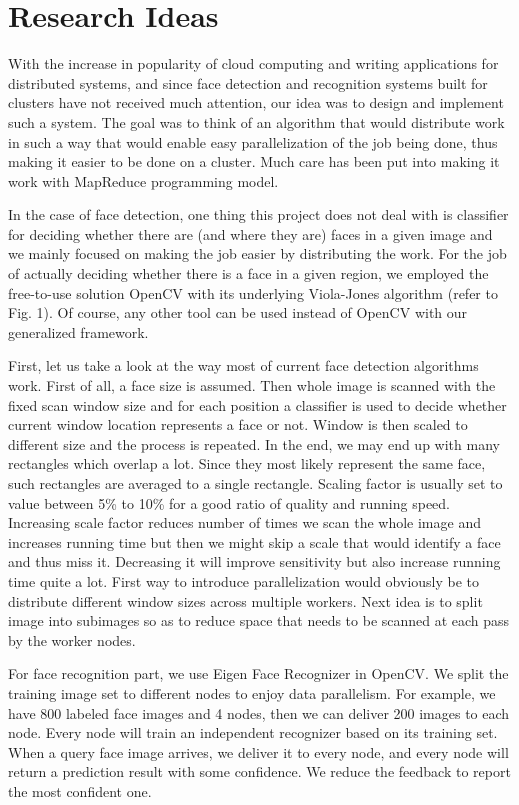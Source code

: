 \documentclass[11pt, draftclsnofoot, onecolumn]{IEEEtran}
\begin{document}
\section{Research Ideas}  \label{sec:ideas}

With the increase in popularity of cloud computing and writing applications for distributed systems, and since face detection and recognition systems built for clusters have not received much attention, our idea was to design and implement such a system. The goal was to think of an algorithm that would distribute work in such a way that would enable easy parallelization of the job being done, thus making it easier to be done on a cluster. Much care has been put into making it work with MapReduce programming model.

In the case of face detection, one thing this project does not deal with is classifier for deciding whether there are (and where they are) faces in a given image and we mainly focused on making the job easier by distributing the work. For the job of actually deciding whether there is a face in a given region, we employed the free-to-use solution OpenCV with its underlying Viola-Jones algorithm (refer to Fig. 1). Of course, any other tool can be used instead of OpenCV with our generalized framework.

First, let us take a look at the way most of current face detection algorithms work. First of all, a face size is assumed. Then whole image is scanned with the fixed scan window size and for each position a classifier is used to decide whether current window location represents a face or not. Window is then scaled to different size and the process is repeated. In the end, we may end up with many rectangles which overlap a lot. Since they most likely represent the same face, such rectangles are averaged to a single rectangle. Scaling factor is usually set to value between 5\% to 10\% for a good ratio of quality and running speed. Increasing scale factor reduces number of times we scan the whole image and increases running time but then we might skip a scale that would identify a face and thus miss it. Decreasing it will improve sensitivity but also increase running time quite a lot. First way to introduce parallelization would obviously be to distribute different window sizes across multiple workers. Next idea is to split image into subimages so as to reduce space that needs to be scanned at each pass by the worker nodes.

For face recognition part, we use Eigen Face Recognizer in OpenCV. We split the training image set to different nodes to enjoy data parallelism. For example, we have 800 labeled face images and 4 nodes, then we can deliver 200 images to each node. Every node will train an independent recognizer based on its training set. When a query face image arrives, we deliver it to every node, and every node will return a prediction result with some confidence. We reduce the feedback to report the most confident one.
\end{document}
